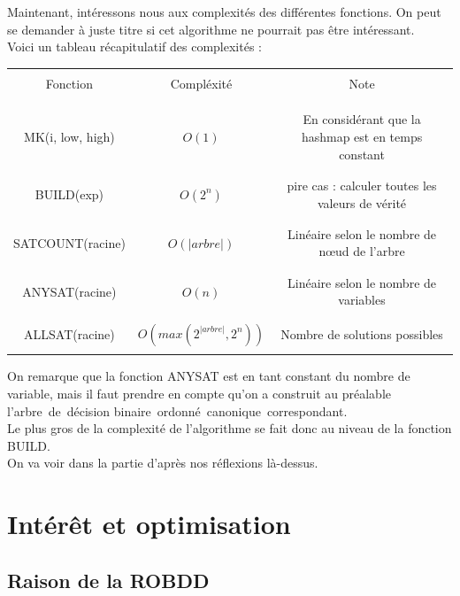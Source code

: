\documentclass[a4paper, oneside]{report}
\newcommand{\adb}{arbre~de~décision binaire~}
\newcommand{\adbo}{\adb ordonné~}
\newcommand{\adboc}{\adbo canonique~}
\begin{document}
Maintenant, intéressons nous aux complexités des différentes fonctions. On peut se demander à juste titre si cet algorithme ne pourrait pas être intéressant.\\
Voici un tableau récapitulatif des complexités :\\
\begin{center}
\begin{tabular}{|c|c|c|}
\hline 
&&\\
Fonction & Compléxité & Note \\ 
&&\\
&&\\
\hline 
&&\\
MK(i, low, high) & $O(1)$ & En considérant que la hashmap est en temps constant \\ 
&&\\
\hline 
&&\\
BUILD(exp) & $O(2^n)$ & pire cas : calculer toutes les valeurs de vérité \\ 
&&\\
\hline 
&&\\
SATCOUNT(racine) & $O(|arbre|)$ & Linéaire selon le nombre de nœud de l'arbre \\ 
&&\\
\hline 
&&\\
ANYSAT(racine) & $O(n)$ & Linéaire selon le nombre de variables \\ 
&&\\
\hline 
&&\\
ALLSAT(racine) & $O(max(2^{|arbre|}, 2^n))$ & Nombre de solutions possibles \\ 
&&\\
\hline 
\end{tabular} 
\end{center}

On remarque que la fonction ANYSAT est en tant constant du nombre de variable, mais il faut prendre en compte qu'on a construit au préalable l'\adboc correspondant.\\
Le plus gros de la complexité de l'algorithme se fait donc au niveau de la fonction BUILD.\\
On va voir dans la partie d'après nos réflexions là-dessus.

\chapter{Intérêt et optimisation}

\section{Raison de la ROBDD}
\end{document}
